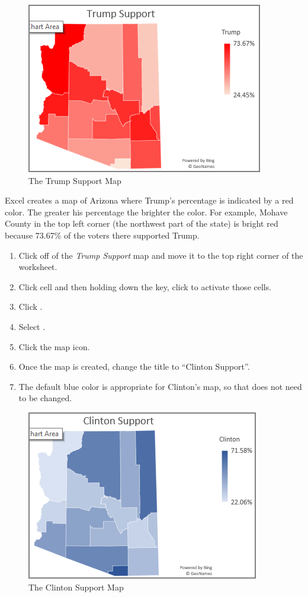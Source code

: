 \begin{figure}[H]
	\centering
	\includegraphics[width=\maxwidth{.95\linewidth}]{gfx/ch08_fig40}
	\caption{The Trump Support Map}
	\label{08:fig40}
\end{figure}

Excel creates a map of Arizona where Trump's percentage is indicated by a red color. The greater his percentage the brighter the color. For example, Mohave County in the top left corner (the northwest part of the state) is bright red because 73.67\% of the voters there supported Trump.

\begin{enumerate}[resume]
	\item Click off of the \textit{Trump Support} map and move it to the top right corner of the worksheet.
	\item Click cell  and then holding down the  key, click  to activate those cells.
	\item Click .
	\item Select .
	\item Click the map icon.
	\item Once the map is created, change the title to ``Clinton Support''.
	\item The default blue color is appropriate for Clinton's map, so that does not need to be changed.
\end{enumerate}

\begin{figure}[H]
	\centering
	\includegraphics[width=\maxwidth{.95\linewidth}]{gfx/ch08_fig41}
	\caption{The Clinton Support Map}
	\label{08:fig41}
\end{figure}

